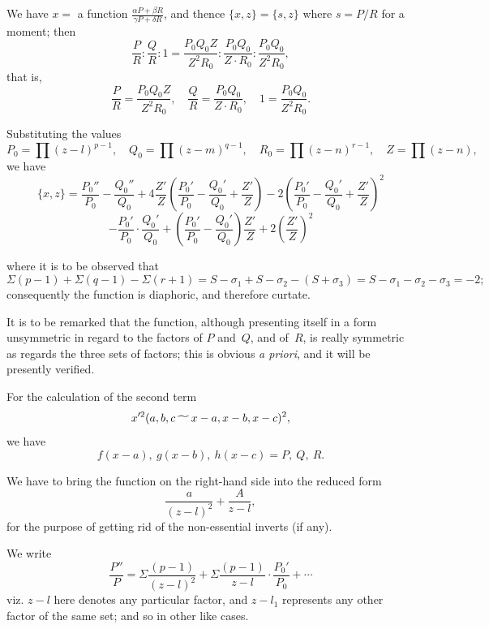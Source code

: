 \documentclass[11pt,a4paper]{book}
\begin{document}
\begin{art}
We have $x = $ a function $\frac{\alpha P + \beta R}{\gamma P + \delta R}$, and thence
$\{x, z\} = \{s, z\}$ where $s = P/R$ for a moment; then
\[
\frac{P}{R} : \frac{Q}{R} : 1 = \frac{P_0 Q_0 Z}{Z^2 R_0} : \frac{P_0 Q_0}{Z \cdot R_0} : \frac{P_0 Q_0}{Z^2 R_0},
\]
that is,
\[
\frac{P}{R} = \frac{P_0 Q_0 Z}{Z^2 R_0}, \quad
\frac{Q}{R} = \frac{P_0 Q_0}{Z \cdot R_0}, \quad
1 = \frac{P_0 Q_0}{Z^2 R_0}.
\]

Substituting the values
\[
P_0 = \prod (z-l)^{p-1}, \quad Q_0 = \prod (z-m)^{q-1}, \quad
R_0 = \prod (z-n)^{r-1}, \quad Z = \prod (z-n),
\]
we have
\[
\{x, z\} = \frac{P_0''}{P_0} - \frac{Q_0''}{Q_0} + 4\frac{Z'}{Z}
\left(\frac{P_0'}{P_0} - \frac{Q_0'}{Q_0} + \frac{Z'}{Z}\right)
- 2\left(\frac{P_0'}{P_0} - \frac{Q_0'}{Q_0} + \frac{Z'}{Z}\right)^2
\]
\[
- \frac{P_0'}{P_0} \cdot \frac{Q_0'}{Q_0}
+ \left(\frac{P_0'}{P_0} - \frac{Q_0'}{Q_0}\right) \frac{Z'}{Z}
+ 2\left(\frac{Z'}{Z}\right)^2
\]
\end{art}


\begin{art}
where it is to be observed that
\[
\Sigma(p-1) + \Sigma(q-1) - \Sigma(r+1)
= S - \sigma_1 + S - \sigma_2 - (S + \sigma_3) = S - \sigma_1 - \sigma_2 - \sigma_3 = -2;
\]
consequently the function is diaphoric, and therefore curtate.

It is to be remarked that the function, although presenting itself in a
form unsymmetric in regard to the factors of $P$ and~$Q$, and of~$R$,
is really symmetric as regards the three sets of factors; this is obvious
\textit{a priori}, and it will be presently verified.
\end{art}

\begin{art}
For the calculation of the second term
\[
x'^2 (a, b, c \,\raisebox{-.5ex}{$\widetilde{\phantom{aa}}$}\, x-a, x-b, x-c)^2,
\]
we have
\[
f(x-a),\ g(x-b),\ h(x-c) = P,\ Q,\ R.
\]
\end{art}

\begin{art}
We have to bring the function on the right-hand side into the reduced form
\[
\frac{a}{(z-l)^2} + \frac{A}{z-l},
\]
for the purpose of getting rid of the non-essential inverts (if any).

We write
\[
\frac{P''}{P} = \Sigma \frac{(p-1)}{(z-l)^2} + \Sigma \frac{(p-1)}{z-l} \cdot \frac{P_0'}{P_0} + \cdots
\]
viz. $z-l$ here denotes any particular factor, and $z-l_1$ represents any
other factor of the same set; and so in other like cases.
\end{art}
\end{document}
